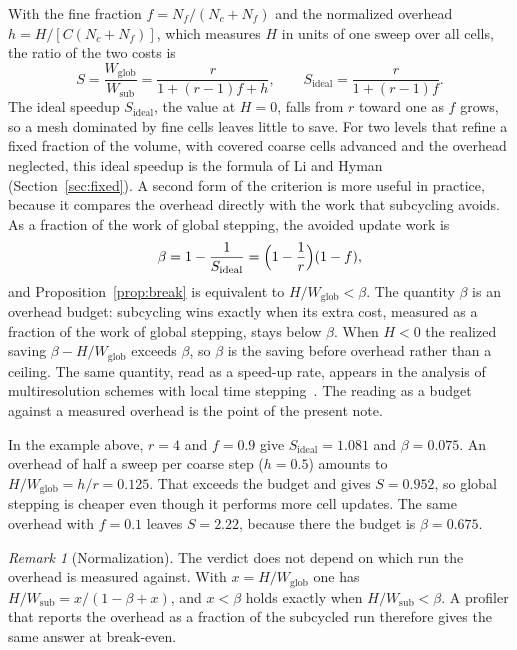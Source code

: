 \documentclass[12pt]{article}
\theoremstyle{remark}
\newtheorem{remark}{Remark}
\newcommand{\WG}{W_{\mathrm{glob}}}
\newcommand{\WL}{W_{\mathrm{sub}}}
\newcommand{\Sid}{S_{\mathrm{ideal}}}
\begin{document}
With the fine fraction $f=N_f/(N_c+N_f)$ and the normalized overhead $h=H/[C(N_c+N_f)]$, which measures $H$ in units of one sweep over all cells, the ratio of the two costs is
\begin{equation}\label{eq:speed}
S=\frac{\WG}{\WL}=\frac{r}{1+(r-1)f+h},\qquad \Sid=\frac{r}{1+(r-1)f}.
\end{equation}
The ideal speedup $\Sid$, the value at $H=0$, falls from $r$ toward one as $f$ grows, so a mesh dominated by fine cells leaves little to save. For two levels that refine a fixed fraction of the volume, with covered coarse cells advanced and the overhead neglected, this ideal speedup is the formula of Li and Hyman~\cite{li2006local} (Section~\ref{sec:fixed}). A second form of the criterion is more useful in practice, because it compares the overhead directly with the work that subcycling avoids. As a fraction of the work of global stepping, the avoided update work is
\begin{equation}\label{eq:budget}
\beta=1-\frac{1}{\Sid}=\Bigl(1-\frac{1}{r}\Bigr)(1-f),
\end{equation}
and Proposition~\ref{prop:break} is equivalent to $H/\WG<\beta$. The quantity $\beta$ is an overhead budget: subcycling wins exactly when its extra cost, measured as a fraction of the work of global stepping, stays below $\beta$. When $H<0$ the realized saving $\beta-H/\WG$ exceeds $\beta$, so $\beta$ is the saving before overhead rather than a ceiling. The same quantity, read as a speed-up rate, appears in the analysis of multiresolution schemes with local time stepping~\cite{domingues2008adaptive}. The reading as a budget against a measured overhead is the point of the present note.

In the example above, $r=4$ and $f=0.9$ give $\Sid=1.081$ and $\beta=0.075$. An overhead of half a sweep per coarse step ($h=0.5$) amounts to $H/\WG=h/r=0.125$. That exceeds the budget and gives $S=0.952$, so global stepping is cheaper even though it performs more cell updates. The same overhead with $f=0.1$ leaves $S=2.22$, because there the budget is $\beta=0.675$.

\begin{remark}[Normalization]\label{rem:norm}
The verdict does not depend on which run the overhead is measured against. With $x=H/\WG$ one has $H/\WL=x/(1-\beta+x)$, and $x<\beta$ holds exactly when $H/\WL<\beta$. A profiler that reports the overhead as a fraction of the subcycled run therefore gives the same answer at break-even.
\end{remark}
\end{document}
